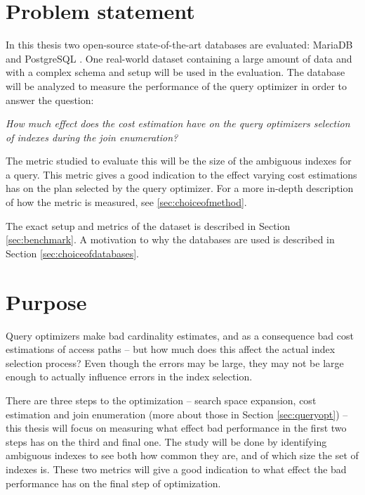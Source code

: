 \section{Problem statement}
In this thesis two open-source state-of-the-art databases are evaluated: MariaDB \cite{mariadb_m} and PostgreSQL \cite{postgresql_ptwmaosd}. One real-world dataset containing a large amount of data and with a complex schema and setup will be used in the evaluation. The database will be analyzed to measure the performance of the query optimizer in order to answer the question:

\textit{How much effect does the cost estimation have on the query optimizers selection of indexes during the join enumeration?}

The metric studied to evaluate this will be the size of the ambiguous indexes for a query. This metric gives a good indication to the effect varying cost estimations has on the plan selected by the query optimizer. For a more in-depth description of how the metric is measured, see \ref{sec:choiceofmethod}.

The exact setup and metrics of the dataset is described in Section \ref{sec:benchmark}. A motivation to why the databases are used is described in Section \ref{sec:choiceofdatabases}.

\section{Purpose} \label{sec:purpose}
Query optimizers make bad cardinality estimates, and as a consequence bad cost estimations of access paths \cite{leis_2015_how_hgaqor} – but how much does this affect the actual index selection process? Even though the errors may be large, they may not be large enough to actually influence errors in the index selection.

There are three steps to the optimization – search space expansion, cost estimation and join enumeration (more about those in Section \ref{sec:queryopt}) – this thesis will focus on measuring what effect bad performance in the first two steps has on the third and final one. The study will be done by identifying ambiguous indexes to see both how common they are, and of which size the set of indexes is. These two metrics will give a good indication to what effect the bad performance has on the final step of optimization.

